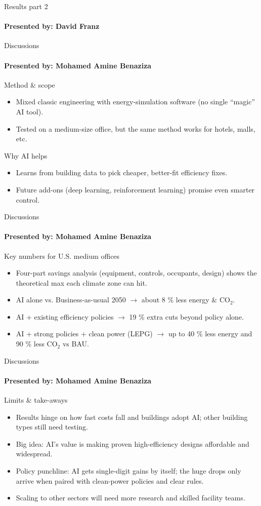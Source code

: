 \documentclass{beamer}
\begin{document}
\begin{frame}{Results part 2}
\framesubtitle{Presented by: David Franz}


\end{frame}

\begin{frame}{Discussions}
\framesubtitle{Presented by: Mohamed Amine Benaziza}

Method \& scope
\begin{itemize}
    \item Mixed classic engineering with energy-simulation software (no single “magic” AI
tool).
    \item Tested on a medium-size office, but the same method works for hotels, malls, etc.
\end{itemize}
Why AI helps
\begin{itemize}
    \item Learns from building data to pick cheaper, better-fit efficiency fixes.
    \item Future add-ons (deep learning, reinforcement learning) promise even smarter control.
\end{itemize}

\end{frame}

\begin{frame}{Discussions}
\framesubtitle{Presented by: Mohamed Amine Benaziza}

Key numbers for U.S. medium offices
\begin{itemize}
    \item Four-part savings analysis (equipment, controls, occupants, design) shows
the theoretical max each climate zone can hit.
    \item AI alone vs. Business-as-usual 2050 $\to$ about 8 \% less energy \& CO$_2$.
    \item AI + existing efficiency policies $\to$ 19 \% extra cuts beyond policy alone.
    \item AI + strong policies + clean power (LEPG) $\to$ up to 40 \% less energy and 90 \% less CO$_2$ vs BAU.
\end{itemize}

\end{frame}

\begin{frame}{Discussions}
\framesubtitle{Presented by: Mohamed Amine Benaziza}

Limits \& take-aways
\begin{itemize}
    \item Results hinge on how fast costs fall and buildings adopt AI; other building types still need testing.
    \item Big idea: AI’s value is making proven high-efficiency designs affordable and widespread.
    \item Policy punchline: AI gets single-digit gains by itself; the huge drops only arrive when paired with clean-power policies and clear rules.
    \item Scaling to other sectors will need more research and skilled facility teams.
\end{itemize}

\end{frame}
\end{document}
